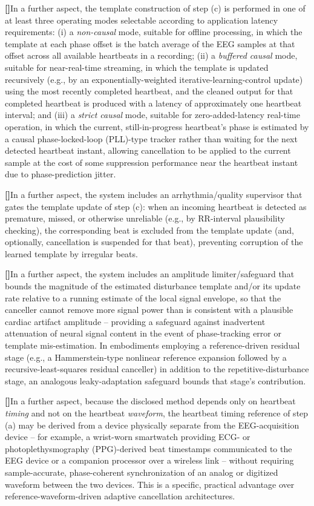 \documentclass[12pt]{article}
\newcounter{para}
\newcommand{\parnum}{\stepcounter{para}\noindent\textbf{[\thepara]}\quad}
\begin{document}
\parnum In a further aspect, the template construction of step (c) is performed in one of at least three operating modes selectable according to application latency requirements: (i) a \emph{non-causal} mode, suitable for offline processing, in which the template at each phase offset is the batch average of the EEG samples at that offset across all available heartbeats in a recording; (ii) a \emph{buffered causal} mode, suitable for near-real-time streaming, in which the template is updated recursively (e.g., by an exponentially-weighted iterative-learning-control update) using the most recently completed heartbeat, and the cleaned output for that completed heartbeat is produced with a latency of approximately one heartbeat interval; and (iii) a \emph{strict causal} mode, suitable for zero-added-latency real-time operation, in which the current, still-in-progress heartbeat's phase is estimated by a causal phase-locked-loop (PLL)-type tracker rather than waiting for the next detected heartbeat instant, allowing cancellation to be applied to the current sample at the cost of some suppression performance near the heartbeat instant due to phase-prediction jitter.

\parnum In a further aspect, the system includes an arrhythmia/quality supervisor that gates the template update of step (c): when an incoming heartbeat is detected as premature, missed, or otherwise unreliable (e.g., by RR-interval plausibility checking), the corresponding beat is excluded from the template update (and, optionally, cancellation is suspended for that beat), preventing corruption of the learned template by irregular beats.

\parnum In a further aspect, the system includes an amplitude limiter/safeguard that bounds the magnitude of the estimated disturbance template and/or its update rate relative to a running estimate of the local signal envelope, so that the canceller cannot remove more signal power than is consistent with a plausible cardiac artifact amplitude -- providing a safeguard against inadvertent attenuation of neural signal content in the event of phase-tracking error or template mis-estimation. In embodiments employing a reference-driven residual stage (e.g., a Hammerstein-type nonlinear reference expansion followed by a recursive-least-squares residual canceller) in addition to the repetitive-disturbance stage, an analogous leaky-adaptation safeguard bounds that stage's contribution.

\parnum In a further aspect, because the disclosed method depends only on heartbeat \emph{timing} and not on the heartbeat \emph{waveform}, the heartbeat timing reference of step (a) may be derived from a device physically separate from the EEG-acquisition device -- for example, a wrist-worn smartwatch providing ECG- or photoplethysmography (PPG)-derived beat timestamps communicated to the EEG device or a companion processor over a wireless link -- without requiring sample-accurate, phase-coherent synchronization of an analog or digitized waveform between the two devices. This is a specific, practical advantage over reference-waveform-driven adaptive cancellation architectures.
\end{document}
